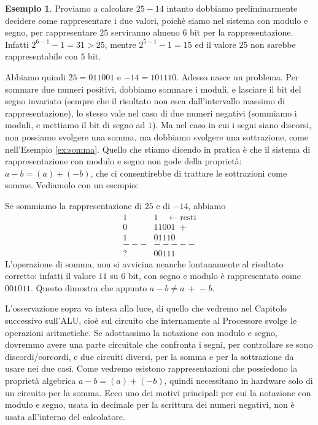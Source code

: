 \documentclass[a4paper]{book}
\theoremstyle{definition}
\newtheorem{ex}{Esempio}
\begin{document}
\begin{ex} Proviamo a calcolare $25 - 14$ intanto dobbiamo preliminarmente decidere come rappresentare i due valori, poichè siamo nel sistema con modulo e segno, per rappresentare $25$ serviranno almeno $6$ bit per la rappresentazione. Infatti $2^{6-1}-1 = 31 > 25$, mentre $2^{5-1}-1 = 15$ ed il valore $25$ non sarebbe rappresentabile con $5$ bit. 

Abbiamo quindi $25 = 011001$ e  $-14 = 101110$. Adesso nasce un problema. 
Per sommare due numeri positivi, dobbiamo sommare i moduli, e lasciare il bit
del segno invariato (sempre che il risultato non esca dall'intervallo massimo
di rappresentazione), lo stesso vale nel caso di due numeri negativi (sommiamo
i moduli, e mettiamo il bit di segno ad $1$). Ma nel caso in cui i segni siano
discorsi, non possiamo svolgere una somma, ma dobbiamo svolgere una sottrazione,
come nell'Esempio \ref{ex:somma}. Quello che stiamo dicendo in pratica è che
il sistema di rappresentazione con modulo e segno non gode della proprietà: $a-b = (a)+(-b)$, che ci consentirebbe di trattare le sottrazioni come somme. Vediamolo con un esempio:

Se sommiamo la rappresentazione di $25$ e di $-14$, abbiamo
\begin{align*}
	    1&1 \quad \leftarrow\text{resti}\\ 
	    0&11001 \;+\\
	    1&01110\\
      ---&-----\\
	    ?&00111
\end{align*} L'operazione di somma, non si avvicina neanche lontanamente
al risultato corretto: infatti il valore $11$ su $6$ bit, con segno e modulo è rappresentato come $001011$. Questo dimostra che appunto $a-b \neq a \,+\, -b$.
\end{ex}

L'osservazione sopra va intesa alla luce, di quello che vedremo nel Capitolo successivo sull'ALU, cioè sul circuito che internamente al Processore svolge le
operazioni aritmetiche. Se adottassimo la notazione con modulo e segno, dovremmo avere una parte circuitale che confronta i segni, per controllare se
sono discordi/corcordi, e due circuiti diversi, per la somma e per la sottrazione da usare nei due casi. Come vedremo esistono
rappresentazioni che possiedono la proprietà algebrica $a-b = (a)+(-b)$,
quindi necessitano in hardware solo di un circuito per la somma. Ecco
uno dei motivi principali per cui la notazione con modulo e segno, usata
in decimale per la scrittura dei numeri negativi, non è usata all'interno del calcolatore.
\end{document}
